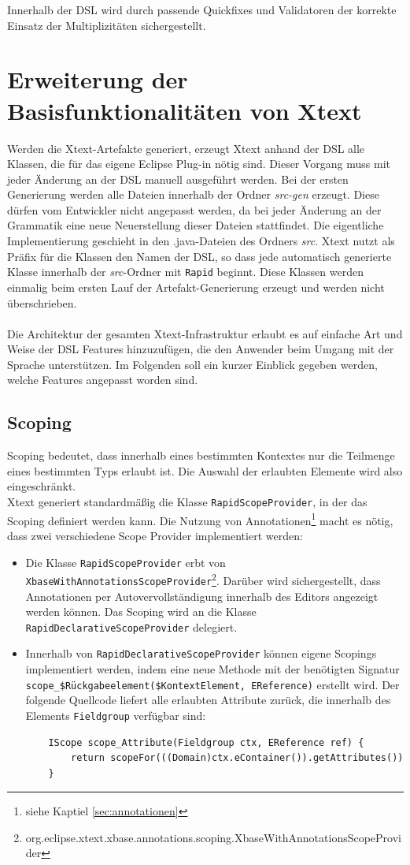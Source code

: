 \documentclass[a4paper,12pt]{scrreprt}
\begin{document}
Innerhalb der DSL wird durch passende Quickfixes und Validatoren der korrekte Einsatz der Multiplizitäten sichergestellt.
\section{Erweiterung der Ba\-sis\-funk\-tio\-na\-li\-tä\-ten von Xtext}
Werden die Xtext-Artefakte generiert, erzeugt Xtext anhand der DSL alle Klassen, die für das eigene Eclipse Plug-in nötig sind. Dieser Vorgang muss mit jeder Änderung an der DSL manuell ausgeführt werden.
Bei der ersten Generierung werden alle Dateien innerhalb der Ordner \emph{src-gen} erzeugt. Diese dürfen vom Entwickler nicht angepasst werden, da bei jeder Änderung an der Grammatik eine neue Neuerstellung dieser Dateien stattfindet.
Die eigentliche Implementierung geschieht in den .java-Dateien des Ordners \emph{src}. Xtext nutzt als Präfix für die Klassen den Namen der DSL, so dass jede automatisch generierte Klasse innerhalb der \emph{src}-Ordner mit \verb+Rapid+ beginnt. Diese Klassen werden einmalig beim ersten Lauf der Artefakt-Generierung erzeugt und werden nicht überschrieben.
\\
\\
Die Architektur der gesamten Xtext-Infrastruktur erlaubt es auf einfache Art und Weise der DSL Features hinzuzufügen, die den Anwender beim Umgang mit der Sprache unterstützen.
Im Folgenden soll ein kurzer Einblick gegeben werden, welche Features angepasst worden sind.
\label{subsec:scoping}
\subsection{Scoping}
Scoping bedeutet, dass innerhalb eines bestimmten Kontextes nur die Teilmenge eines bestimmten Typs erlaubt ist. Die Auswahl der erlaubten Elemente wird also eingeschränkt.
\\Xtext generiert standardmäßig die Klasse \verb+RapidScopeProvider+, in der das Scoping definiert werden kann. Die Nutzung von Annotationen\footnote{siehe Kaptiel \ref{sec:annotationen}}  macht es nötig, dass zwei verschiedene Scope Provider implementiert werden:
\begin{itemize}
	\item Die Klasse \verb+RapidScopeProvider+ erbt von \verb+XbaseWithAnnotationsScopeProvider+\footnote{org.eclipse.xtext.xbase.annotations.scoping.XbaseWithAnnotationsScopeProvider}. Darüber wird sichergestellt, dass Annotationen per Autovervollständigung innerhalb des Editors angezeigt werden können. Das Scoping wird an die Klasse \verb+RapidDeclarativeScopeProvider+ delegiert.
	\item Innerhalb von \verb+RapidDeclarativeScopeProvider+ können eigene Scopings implementiert werden, indem eine neue Methode mit der benötigten Signatur \verb+scope_$Rückgabeelement($KontextElement, EReference)+ erstellt wird. Der folgende Quellcode liefert alle erlaubten Attribute zurück, die innerhalb des Elements \verb+Fieldgroup+ verfügbar sind:
	\begin{verbatim}
	IScope scope_Attribute(Fieldgroup ctx, EReference ref) {
	    return scopeFor(((Domain)ctx.eContainer()).getAttributes())
	}
	\end{verbatim}
\end{itemize}
\end{document}
